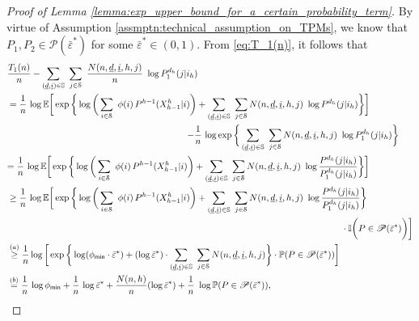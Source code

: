 \begin{proof}[Proof of Lemma \ref{lemma:exp_upper_bound_for_a_certain_probability_term}]
By virtue of Assumption \ref{assmptn:technical_assumption_on_TPMs}, we know that $P_1, P_2\in \mathscr{P}(\bar{\varepsilon}^*)$ for some $\bar{\varepsilon}^*\in (0, 1)$. From \eqref{eq:T_1(n)}, it follows that
\begin{align}
	&\frac{T_1(n)}{n}-\sum\limits_{(\underline{d}, \underline{i})\in \mathbb{S}}~\sum\limits_{j\in \mathcal{S}}~\frac{N(n, \underline{d}, \underline{i}, h, j)}{n}~\log P_1^{d_h}(j|i_h)\nonumber\\
	&={\color{black}\frac{1}{n}\,\log\mathbb{E}\bigg[\exp\bigg\lbrace\log\bigg(\sum\limits_{i\in \mathcal{S}}~\phi(i)\,P^{h-1}(X_{h-1}^h|i)\bigg)+\sum\limits_{(\underline{d}, \underline{i})\in \mathbb{S}}~\sum\limits_{j\in \mathcal{S}}N(n, \underline{d}, \underline{i}, h, j)~ \log P^{d_h}(j|i_h)\bigg\rbrace\bigg]}\nonumber\\
	&\hspace{7cm}{\color{black} -\frac{1}{n}\,\log\exp\bigg\lbrace\sum\limits_{(\underline{d}, \underline{i})\in \mathbb{S}}~\sum\limits_{j\in \mathcal{S}}N(n, \underline{d}, \underline{i}, h, j)~ \log P_1^{d_h}(j|i_h)\bigg\rbrace}\nonumber\\
	&{\color{black} =\frac{1}{n}\,\log\mathbb{E}\bigg[\exp\bigg\lbrace\log\bigg(\sum\limits_{i\in \mathcal{S}}~\phi(i)\,P^{h-1}(X_{h-1}^h|i)\bigg) + \sum\limits_{(\underline{d}, \underline{i})\in \mathbb{S}}~\sum\limits_{j\in \mathcal{S}}N(n, \underline{d}, \underline{i}, h, j)~ \log \frac{P^{d_h}(j|i_h)}{P_1^{d_h}(j|i_h)}\bigg\rbrace\bigg]}\nonumber\\
	&\geq \frac{1}{n}\,\log\mathbb{E}\bigg[\exp\bigg\lbrace\log\bigg(\sum\limits_{i\in \mathcal{S}}~\phi(i)\,P^{h-1}(X_{h-1}^h|i)\bigg) + \sum\limits_{(\underline{d}, \underline{i})\in \mathbb{S}}~\sum\limits_{j\in \mathcal{S}}N(n, \underline{d}, \underline{i}, h, j)~ \log \frac{P^{d_h}(j|i_h)}{P_1^{d_h}(j|i_h)}\bigg\rbrace\nonumber\\
	&\hspace{13cm}\cdot \mathbb{I}\bigg(P\in \mathscr{P}(\bar{\varepsilon}^*)\bigg)\bigg]\nonumber\\
	&\stackrel{(a)}{\geq} \frac{1}{n}\log \bigg[\exp\bigg\lbrace\log (\phi_{\textsf{min}}\cdot \bar{\varepsilon}^*) + (\log \bar{\varepsilon}^*)\cdot \sum\limits_{(\underline{d}, \underline{i})\in \mathbb{S}}~\sum\limits_{j\in \mathcal{S}}N(n, \underline{d}, \underline{i}, h, j)\bigg\rbrace \cdot \mathbb{P}(P\in \mathscr{P}(\bar{\varepsilon}^*))\bigg]\nonumber\\
	&\stackrel{(b)}{=} \frac{1}{n}\,\log \phi_{\textsf{min}}+\frac{1}{n}\,\log \bar{\varepsilon}^* + \frac{N(n, h)}{n}(\log \bar{\varepsilon}^*) + \frac{1}{n}~\log \mathbb{P}(P\in \mathscr{P}(\bar{\varepsilon}^*)),

\end{align}
\end{proof}

